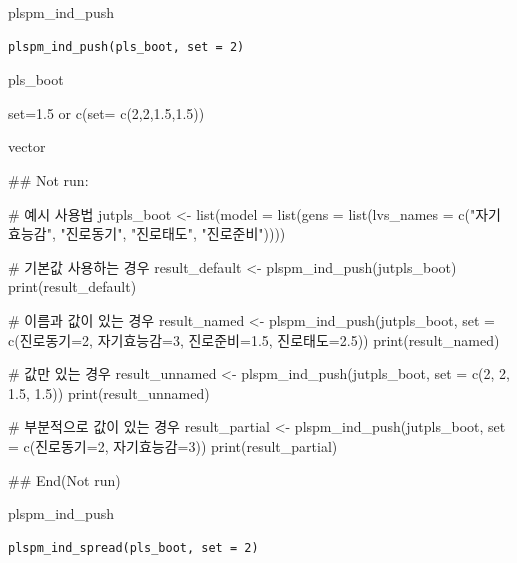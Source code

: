 \documentclass[a4paper]{book}
\begin{document}
%
\begin{Description}
plspm\_ind\_push
\end{Description}
%
\begin{Usage}
\begin{verbatim}
plspm_ind_push(pls_boot, set = 2)
\end{verbatim}
\end{Usage}
%
\begin{Arguments}
\begin{ldescription}
\item[\code{pls\_boot}] pls\_boot

\item[\code{set}] set=1.5 or c(set= c(2,2,1.5,1.5))
\end{ldescription}
\end{Arguments}
%
\begin{Value}
vector
\end{Value}
%
\begin{Examples}
\begin{ExampleCode}

## Not run: 

# 예시 사용법
jutpls_boot <- list(model = list(gens = list(lvs_names = c("자기효능감", "진로동기", "진로태도", "진로준비"))))

# 기본값 사용하는 경우
result_default <- plspm_ind_push(jutpls_boot)
print(result_default)

# 이름과 값이 있는 경우
result_named <- plspm_ind_push(jutpls_boot, set = c(진로동기=2, 자기효능감=3, 진로준비=1.5, 진로태도=2.5))
print(result_named)

# 값만 있는 경우
result_unnamed <- plspm_ind_push(jutpls_boot, set = c(2, 2, 1.5, 1.5))
print(result_unnamed)

# 부분적으로 값이 있는 경우
result_partial <- plspm_ind_push(jutpls_boot, set = c(진로동기=2, 자기효능감=3))
print(result_partial)


## End(Not run)



\end{ExampleCode}
\end{Examples}
%
\begin{Description}
plspm\_ind\_push
\end{Description}
%
\begin{Usage}
\begin{verbatim}
plspm_ind_spread(pls_boot, set = 2)
\end{verbatim}
\end{Usage}
\end{document}
